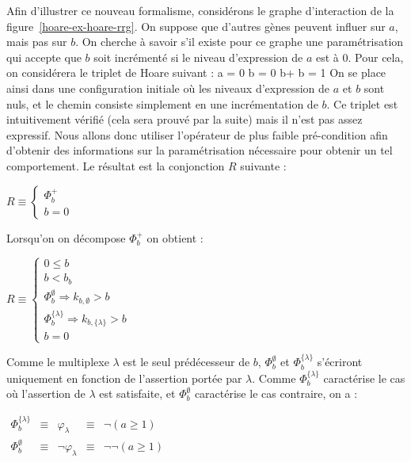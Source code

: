 Afin d'illustrer ce nouveau formalisme, considérons le graphe d'interaction de la figure~\ref{hoare-ex-hoare-rrg}. On suppose que d'autres gènes peuvent influer sur $a$, mais pas sur $b$.
On cherche à savoir s'il existe pour ce graphe une paramétrisation qui accepte que $b$ soit incrémenté si le niveau d'expression de $a$ est à $0$. Pour cela, on considérera le triplet de Hoare suivant :
  \hbegin a = 0 \wedge b = 0 \ha b+ \hb b = 1 \hend
On se place ainsi dans une configuration initiale où les niveaux d'expression de $a$ et $b$ sont nuls, et le chemin consiste simplement en une incrémentation de $b$. Ce triplet est intuitivement vérifié (cela sera prouvé par la suite) mais il n'est pas assez expressif. Nous allons donc utiliser l'opérateur de plus faible pré-condition afin d'obtenir des informations sur la paramétrisation nécessaire pour obtenir un tel comportement. Le résultat est la conjonction $R$ suivante :
\begin{listesanspuce}
\item $R \equiv \left\{\begin{array}{l}
  \Phi^+_b\\
  b = 0
\end{array}\right.$
\end{listesanspuce}
Lorsqu'on on décompose $\Phi^+_b$ on obtient :
\begin{listesanspuce}
\item $R \equiv \left\{\begin{array}{l}
  0 \leq b\\
  b < b_b\\
  \Phi^{\emptyset}_b \Rightarrow k_{b, \emptyset} > b\\
  \Phi^{\{\lambda\}}_b \Rightarrow k_{b, \{\lambda\}} > b\\
  b = 0
\end{array}\right.$
\end{listesanspuce}
Comme le multiplexe $\lambda$ est le seul prédécesseur de $b$, $\Phi^{\emptyset}_b$ et $\Phi^{\{\lambda\}}_b$ s'écriront uniquement en fonction de l'assertion portée par $\lambda$. Comme $\Phi^{\{\lambda\}}_b$ caractérise le cas où l'assertion de $\lambda$ est satisfaite, et $\Phi^{\emptyset}_b$ caractérise le cas contraire, on a :
\begin{listesanspuce}
  \item $\begin{array}{llrlr}
  \Phi^{\{\lambda\}}_b &\equiv& \varphi_{\lambda} &\equiv& \neg (a \geq 1)\\
  \Phi^{\emptyset}_b &\equiv& \neg \varphi_{\lambda} &\equiv& \neg\neg (a \geq 1)
\end{array}$
\end{listesanspuce}
